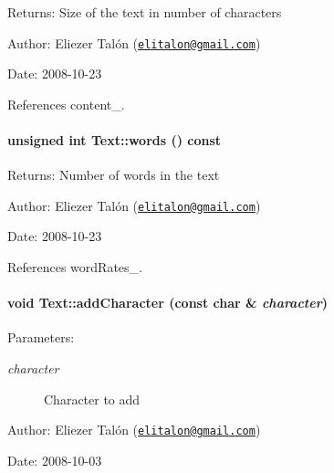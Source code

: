 \begin{Desc}
\item[Returns:]Size of the text in number of characters\end{Desc}
\begin{Desc}
\item[Author:]Eliezer Talón (\href{mailto:elitalon@gmail.com}{\tt elitalon@gmail.com}) \end{Desc}
\begin{Desc}
\item[Date:]2008-10-23 \end{Desc}


References content\_\-.\hypertarget{class_text_edfd71af7802a2d72eed7365f081a66d}{
\paragraph[words]{\setlength{\rightskip}{0pt plus 5cm}unsigned int Text::words () const}\hfill}
\label{class_text_edfd71af7802a2d72eed7365f081a66d}


\begin{Desc}
\item[Returns:]Number of words in the text\end{Desc}
\begin{Desc}
\item[Author:]Eliezer Talón (\href{mailto:elitalon@gmail.com}{\tt elitalon@gmail.com}) \end{Desc}
\begin{Desc}
\item[Date:]2008-10-23 \end{Desc}


References wordRates\_\-.\hypertarget{class_text_6e6da63c90af68639adc7dd1336f6bf9}{
\paragraph[addCharacter]{\setlength{\rightskip}{0pt plus 5cm}void Text::addCharacter (const char \& {\em character})}\hfill}
\label{class_text_6e6da63c90af68639adc7dd1336f6bf9}


\begin{Desc}
\item[Parameters:]
\begin{description}
\item[{\em character}]Character to add\end{description}
\end{Desc}
\begin{Desc}
\item[Author:]Eliezer Talón (\href{mailto:elitalon@gmail.com}{\tt elitalon@gmail.com}) \end{Desc}
\begin{Desc}
\item[Date:]2008-10-03 \end{Desc}


